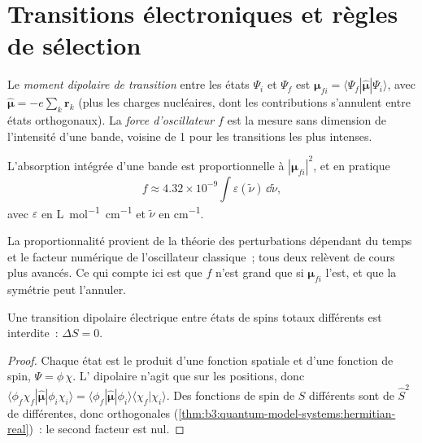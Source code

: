 \section{Transitions électroniques et règles de sélection}

\begin{definition}\label{def:b3:electronic-spectroscopy:transition-dipole}
Le \emph{moment dipolaire de transition} entre
les états $\Psi_i$ et $\Psi_f$ est $\boldsymbol\mu_{fi} = \langle\Psi_f|\hat{\boldsymbol\mu}|\Psi_i
\rangle$, avec $\hat{\boldsymbol\mu} = -e\sum_k\mathbf r_k$ (plus les
charges nucléaires, dont les contributions s'annulent entre états
orthogonaux). La \emph{force
d'oscillateur} $f$ est la mesure sans dimension
de l'intensité d'une bande, voisine de 1 pour les transitions les plus
intenses.
\end{definition}

\begin{proposition}\label{prop:b3:electronic-spectroscopy:intensity}
L'absorption intégrée d'une bande est proportionnelle à $|\boldsymbol\mu_{fi}|^2$,
et en pratique
\[
f \approx 4.32\times10^{-9}\int\varepsilon(\tilde\nu)\,\dd\tilde\nu,
\]
avec $\varepsilon$ en \unit{L.mol^{-1}.cm^{-1}} et $\tilde\nu$ en \unit{cm^{-1}}.
\end{proposition}
\admitted

La proportionnalité provient de la théorie des perturbations dépendant du
temps et le facteur numérique de l'oscillateur classique~; tous deux
relèvent de cours plus avancés. Ce qui compte ici est que $f$ n'est grand
que si
$\boldsymbol\mu_{fi}$ l'est, et que la symétrie peut l'annuler.

\begin{theorem}\label{thm:b3:electronic-spectroscopy:spin-rule}
Une transition dipolaire électrique entre états de spins totaux
différents est interdite~: $\Delta S = 0$.
\end{theorem}

\begin{proof}
Chaque état est le produit d'une fonction spatiale et d'une fonction de
spin, $\Psi = \phi\,\chi$.
L' dipolaire n'agit que sur les positions, donc $\langle\phi_f\chi_f|\hat{\boldsymbol\mu}|
\phi_i\chi_i\rangle = \langle\phi_f|\hat{\boldsymbol\mu}|\phi_i\rangle\langle\chi_f|\chi_i\rangle$.
Des fonctions de spin de $S$ différents sont  de
$\hat S^2$ de  différentes,
donc orthogonales (\cref{thm:b3:quantum-model-systems:hermitian-real})~:
le second facteur est nul.
\end{proof}

